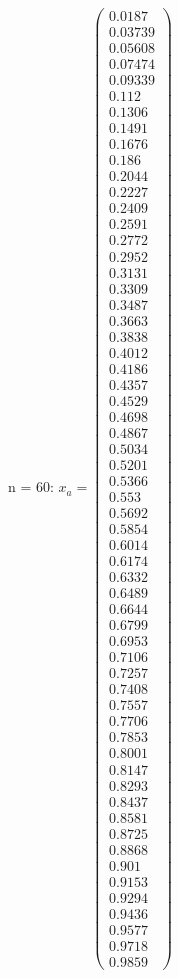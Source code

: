 \documentclass{udpreport}
\begin{document}
\begin{enumerate}
\begin{enumerate}
\begin{itemize}
					 n = 60:	
					$x_{a} = \left(\begin{array}{c} 0.0187\\ 0.03739\\ 0.05608\\ 0.07474\\ 0.09339\\ 0.112\\ 0.1306\\ 0.1491\\ 0.1676\\ 0.186\\ 0.2044\\ 0.2227\\ 0.2409\\ 0.2591\\ 0.2772\\ 0.2952\\ 0.3131\\ 0.3309\\ 0.3487\\ 0.3663\\ 0.3838\\ 0.4012\\ 0.4186\\ 0.4357\\ 0.4529\\ 0.4698\\ 0.4867\\ 0.5034\\ 0.5201\\ 0.5366\\ 0.553\\ 0.5692\\ 0.5854\\ 0.6014\\ 0.6174\\ 0.6332\\ 0.6489\\ 0.6644\\ 0.6799\\ 0.6953\\ 0.7106\\ 0.7257\\ 0.7408\\ 0.7557\\ 0.7706\\ 0.7853\\ 0.8001\\ 0.8147\\ 0.8293\\ 0.8437\\ 0.8581\\ 0.8725\\ 0.8868\\ 0.901\\ 0.9153\\ 0.9294\\ 0.9436\\ 0.9577\\ 0.9718\\ 0.9859 \end{array}\right)$
			

\end{itemize}
\end{enumerate}
\end{enumerate}
\end{document}
